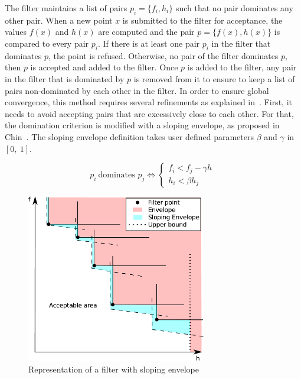 The filter maintains a list of pairs $p_i=\{f_i, h_i\}$ such that no pair dominates any other pair.
When a new point $x$ is submitted to the filter for acceptance, the values $f(x)$ and $h(x)$ are computed and the pair $p = \{f(x), h(x)\}$ is compared to every pair $p_i$.
If there is at least one pair $p_i$ in the filter that dominates $p$, the point is refused.
Otherwise, no pair of the filter dominates $p$, then $p$ is accepted and added to the filter.
Once $p$ is added to the filter, any pair in the filter that is dominated by $p$ is removed from it to ensure to keep a list of pairs non-dominated by each other in the filter.
In order to ensure global convergence, this method requires several refinements as explained in~\cite{fletcher:mathprog:2000}.
First, it needs to avoid accepting pairs that are excessively close to each other. For that, the domination criterion is modified with a sloping envelope, as proposed in Chin~\cite{chin:mathprog:2003}.
The sloping envelope definition takes user defined parameters $\beta$ and $\gamma$ in $[0,\ 1]$.

\begin{definition}
  \begin{equation}
    p_i\ \text{dominates }p_j \Leftrightarrow \left\{
        \begin{array}{l}
    f_i < f_j - \gamma h\ \\
    h_i < \beta h_j
  \end{array}  \right.
  \end{equation}
\end{definition}

\begin{figure}
  \centering
  \includegraphics[width=0.7\textwidth]{filter.pdf}
  \caption{Representation of a filter with sloping envelope}
\label{fig:Filter}
\end{figure}

